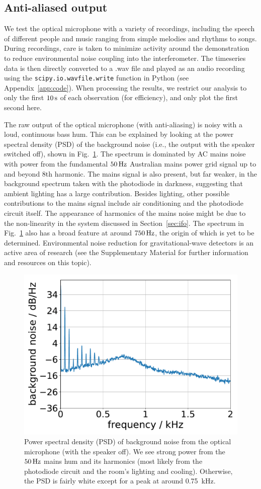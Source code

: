 \documentclass[paper-main.tex]{subfiles}
\begin{document}
\subsection{Anti-aliased output}
\label{sec:initialResultsOpMic}


We test the optical microphone with a variety of recordings, including the speech of different people and music ranging from simple melodies and rhythms to songs. 
During recordings, care is taken to minimize activity around the demonstration to reduce environmental noise coupling into the interferometer. 
The timeseries data is then directly converted to a .wav file and played as an audio recording using the \texttt{scipy.io.wavfile.write} function in Python (see Appendix~\ref{app:code}).
When processing the results, we restrict our analysis to only the first $10\,{\rm s}$ of each observation (for efficiency), and only plot the first second here. 

The raw output of the optical microphone (with anti-aliasing) is noisy with a loud, continuous bass hum. 
This can be explained by looking at the power spectral density (PSD) of the background noise (i.e., the output with the speaker switched off), shown in Fig.~\ref{fig:psd_noise}. 
The spectrum is dominated by AC mains noise with power from the fundamental $50\,{\rm Hz}$ Australian mains power grid signal up to and beyond $8$th harmonic. 
The mains signal is also present, but far weaker, in the background spectrum taken with the photodiode in darkness, suggesting that ambient lighting has a large contribution. 
Besides lighting, other possible contributions to the mains signal include air conditioning and the photodiode circuit itself. 
The appearance of harmonics of the mains noise might be due to the non-linearity in the system discussed in Section~\ref{sec:ifo}. 
The spectrum in Fig.~\ref{fig:psd_noise} also has a broad feature at around $750\,{\rm Hz}$, the origin of which is yet to be determined.
Environmental noise reduction for gravitational-wave detectors is an active area of research (see the Supplementary Material for further information and resources on this topic).




\begin{figure}
	\includegraphics[width=.5\textwidth]{figures/psd_podo_14_6.pdf}
	\caption{\label{fig:psd_noise}
Power spectral density (PSD) of background noise from the optical microphone (with the speaker off). 
We see strong power from the $50\,{\rm Hz}$ mains hum and its harmonics (most likely from the photodiode circuit and the room’s lighting and cooling). Otherwise, the PSD is fairly white except for a peak at around 0.75~kHz.
}
\end{figure}
\end{document}
